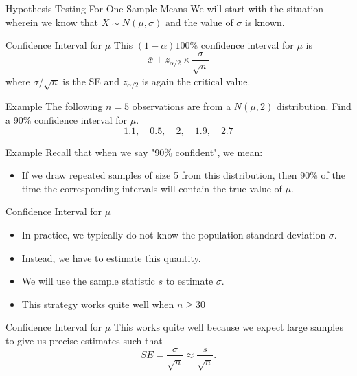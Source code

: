 \begin{frame}{Hypothesis Testing For One-Sample Means}
    We will start with the situation wherein we know that $X\sim N(\mu, \sigma)$ and the value of $\sigma$ is known.
\end{frame}

\begin{frame}{Confidence Interval for $\mu$}
    This $(1-\alpha)100\%$ confidence interval for $\mu$ is
    \[
       \bar{x} \pm z_{\alpha/2}\times\frac{\sigma}{\sqrt{n}} 
    \]
    where $\sigma/\sqrt{n}$ is the SE and $z_{\alpha/2}$ is again the critical value.
\end{frame}

\begin{frame}{Example}
    The following $n=5$ observations are from a $N(\mu, 2)$ distribution. Find a 90\% confidence interval for $\mu$.
    \[
        1.1, \quad 0.5, \quad 2, \quad 1.9, \quad 2.7
    \]
\end{frame}

\begin{frame}{Example}
    Recall that when we say "90\% confident", we mean:
    \begin{itemize}
        \item If we draw repeated samples of size 5 from this distribution, then 90\% of the time the corresponding intervals will contain the true value of $\mu$.
    \end{itemize}
\end{frame}

\begin{frame}{Confidence Interval for $\mu$}
    \begin{itemize}
        \item In practice, we typically do not know the population standard deviation $\sigma$.
        \item Instead, we have to estimate this quantity.
        \item We will use the sample statistic $s$ to estimate $\sigma$.
        \item This strategy works quite well when $n \ge 30$
    \end{itemize}
\end{frame}

\begin{frame}{Confidence Interval for $\mu$}
    This works quite well because we expect large samples to give us precise estimates such that
    \[
        SE = \frac{\sigma}{\sqrt{n}} \approx \frac{s}{\sqrt{n}}.
    \]
\end{frame}

